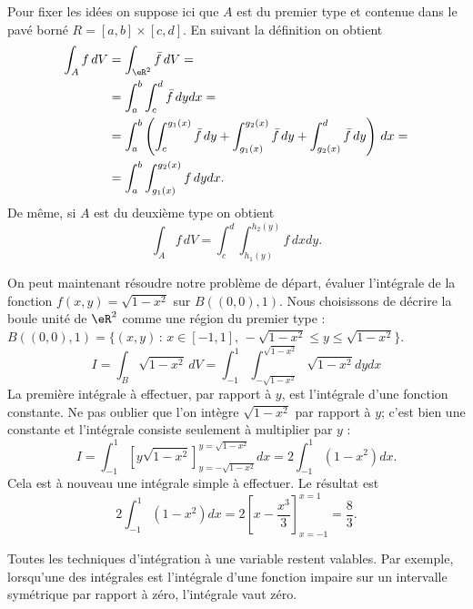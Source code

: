 Pour fixer les idées on suppose ici que $A$ est du premier type et contenue dans le pavé borné $R=[a,b]\times [c,d]$. En suivant la définition on obtient
\begin{equation}
  \begin{aligned}
    \int_A f\, dV&=\int_{\eR^2} \bar f\, dV=\\
    &= \int_a^b\int_c^d \bar f\, dy dx=\\
&= \int_a^b\left(\int_c^{g_1(x)} \bar f\, dy+\int_{g_1(x)}^{g_2(x)} \bar f\, dy+\int_{g_2(x)}^d \bar f\, dy\right)\, dx= \\
&= \int_a^b\int_{g_1(x)}^{g_2(x)}  f\, dy dx.
  \end{aligned}
\end{equation}
De même, si $A$ est du deuxième type on obtient 
\begin{equation}
     \int_A f\, dV=\int_c^d\int_{h_1(y)}^{h_2(y)}  f\, dx dy.
\end{equation}
\begin{example}
	On peut maintenant résoudre notre problème de départ, évaluer l'intégrale de la fonction $f(x,y)=\sqrt{1-x^2}$ sur $B((0,0),1)$. Nous choisissons de décrire la boule unité de $\eR^2$ comme une région du premier type : $B((0,0),1)=\{(x,y)\, :\, x\in[-1,1], \, -\sqrt{1-x^2}\leq y\leq \sqrt{1-x^2} \}$. 
	\begin{equation}
		I=\int_{B}\sqrt{1-x^2}\, dV=\int_{-1}^1\int_{-\sqrt{1-x^2}}^{\sqrt{1-x^2}}\sqrt{1-x^2}dydx
	\end{equation}
	La première intégrale à effectuer, par rapport à $y$, est l'intégrale d'une fonction constante. Ne pas oublier que l'on intègre $\sqrt{1-x^2}$ par rapport à $y$; c'est bien une constante et l'intégrale consiste seulement à multiplier par $y$ :
	\begin{equation}
		I=\int_{-1}^1\left[ y\sqrt{1-x^2} \right]_{y=-\sqrt{1-x^2}}^{y=\sqrt{1-x^2}}dx=2\int_{-1}^1(1-x^2)dx.
	\end{equation}
	Cela est à nouveau une intégrale simple à effectuer. Le résultat est
	\begin{equation}
		2\int_{-1}^1(1-x^2)dx=2\left[ x-\frac{ x^3 }{ 3 } \right]_{x=-1}^{x=1}=\frac{ 8 }{ 3 }.
	\end{equation}
\end{example}
\begin{remark}
	Toutes les techniques d'intégration à une variable restent valables. Par exemple, lorsqu'une des intégrales est l'intégrale d'une fonction impaire sur un intervalle symétrique par rapport à zéro, l'intégrale vaut zéro.
\end{remark}

